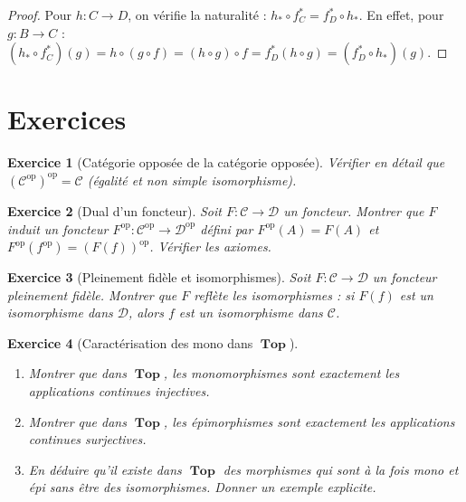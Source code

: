 \documentclass[a4paper,12pt]{book}
\DeclareMathOperator{\Top}{\mathbf{Top}}
\newcommand{\op}{\mathrm{op}}
\newtheorem{exercice}{Exercice}[chapter]
\begin{document}
\begin{proof}
Pour $h : C \to D$, on vérifie la naturalité : $h_* \circ f^*_C = f^*_D \circ h_*$. En effet, pour $g : B \to C$ :
$(h_* \circ f^*_C)(g) = h \circ (g \circ f) = (h \circ g) \circ f = f^*_D(h \circ g) = (f^*_D \circ h_*)(g)$.
\end{proof}

\section{Exercices}

\begin{exercice}[Catégorie opposée de la catégorie opposée]\label{exo:cop-cop}
Vérifier en détail que $(\mathcal{C}^{\op})^{\op} = \mathcal{C}$ (égalité et non simple isomorphisme).
\end{exercice}

\begin{exercice}[Dual d'un foncteur]\label{exo:dual-foncteur}
Soit $F : \mathcal{C} \to \mathcal{D}$ un foncteur. Montrer que $F$ induit un foncteur $F^{\op} : \mathcal{C}^{\op} \to \mathcal{D}^{\op}$ défini par $F^{\op}(A) = F(A)$ et $F^{\op}(f^{\op}) = (F(f))^{\op}$. Vérifier les axiomes.
\end{exercice}

\begin{exercice}[Pleinement fidèle et isomorphismes]\label{exo:pf-iso}
Soit $F : \mathcal{C} \to \mathcal{D}$ un foncteur pleinement fidèle. Montrer que $F$ reflète les isomorphismes : si $F(f)$ est un isomorphisme dans $\mathcal{D}$, alors $f$ est un isomorphisme dans $\mathcal{C}$.
\end{exercice}

\begin{exercice}[Caractérisation des mono dans $\Top$]\label{exo:mono-top}
\index{monomorphisme!dans $\Top$}
\begin{enumerate}[label=(\alph*)]
  \item Montrer que dans $\Top$, les monomorphismes sont exactement les applications continues injectives.
  \item Montrer que dans $\Top$, les épimorphismes sont exactement les applications continues surjectives.
  \item En déduire qu'il existe dans $\Top$ des morphismes qui sont à la fois mono et épi sans être des isomorphismes. Donner un exemple explicite.
\end{enumerate}
\end{exercice}
\end{document}
